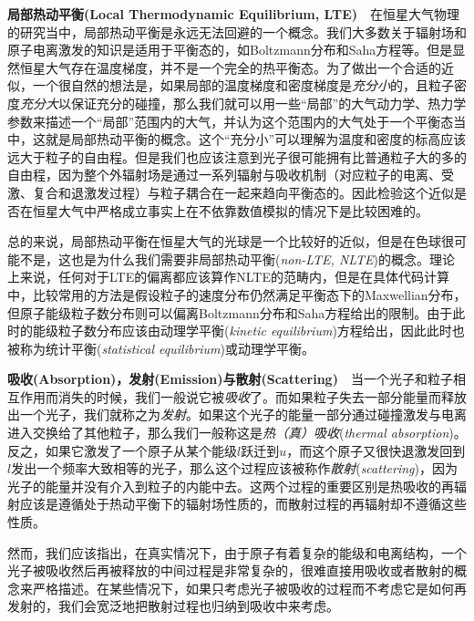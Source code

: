 \noindent
\textbf{局部热动平衡(Local Thermodynamic Equilibrium, LTE)}\ \ 在恒星大气物理的研究当中，局部热动平衡是永远无法回避的一个概念。我们大多数关于辐射场和原子电离激发的知识是适用于平衡态的，如Boltzmann分布和Saha方程等。但是显然恒星大气存在温度梯度，并不是一个完全的热平衡态。为了做出一个合适的近似，一个很自然的想法是，如果局部的温度梯度和密度梯度是\emph{充分小}的，且粒子密度\emph{充分大}以保证充分的碰撞，那么我们就可以用一些“局部”的大气动力学、热力学参数来描述一个“局部”范围内的大气，并认为这个范围内的大气处于一个平衡态当中，这就是局部热动平衡的概念。这个“充分小”可以理解为温度和密度的标高应该远大于粒子的自由程\parencite{Mihalas2014}。但是我们也应该注意到光子很可能拥有比普通粒子大的多的自由程，因为整个外辐射场是通过一系列辐射与吸收机制（对应粒子的电离、受激、复合和退激发过程）与粒子耦合在一起来趋向平衡态的。因此检验这个近似是否在恒星大气中严格成立事实上在不依靠数值模拟的情况下是比较困难的。

总的来说，局部热动平衡在恒星大气的光球是一个比较好的近似，但是在色球很可能不是，这也是为什么我们需要非局部热动平衡(\textit{non-LTE, NLTE})的概念\parencite{Mihalas2014}。理论上来说，任何对于LTE的偏离都应该算作NLTE的范畴内，但是在具体代码计算中，比较常用的方法是假设粒子的速度分布仍然满足平衡态下的Maxwellian分布，但原子能级粒子数分布则可以偏离Boltzmann分布和Saha方程给出的限制\parencites{Kubat2014}。由于此时的能级粒子数分布应该由动理学平衡(\textit{kinetic equilibrium})方程给出，因此此时也被称为统计平衡(\textit{statistical equilibrium})或动理学平衡\parencites{Mihalas2014}。

\noindent
\textbf{吸收(Absorption)，发射(Emission)与散射(Scattering)}\ \ 当一个光子和粒子相互作用而消失的时候，我们一般说它被\emph{吸收}了。而如果粒子失去一部分能量而释放出一个光子，我们就称之为\emph{发射}。如果这个光子的能量一部分通过碰撞激发与电离进入交换给了其他粒子，那么我们一般称这是\emph{热（真）吸收}(\textit{thermal absorption})。反之，如果它激发了一个原子从某个能级$l$跃迁到$u$，而这个原子又很快退激发回到$l$发出一个频率大致相等的光子，那么这个过程应该被称作\emph{散射}(\textit{scattering})，因为光子的能量并没有介入到粒子的内能中去。这两个过程的重要区别是热吸收的再辐射应该是遵循处于热动平衡下的辐射场性质的，而散射过程的再辐射却不遵循这些性质。

然而，我们应该指出，在真实情况下，由于原子有着复杂的能级和电离结构，一个光子被吸收然后再被释放的中间过程是非常复杂的，很难直接用吸收或者散射的概念来严格描述。在某些情况下，如果只考虑光子被吸收的过程而不考虑它是如何再发射的，我们会宽泛地把散射过程也归纳到吸收中来考虑。

